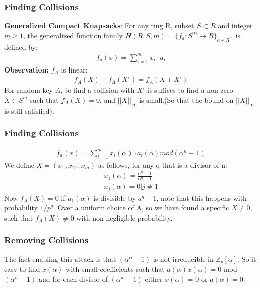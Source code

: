 \documentclass{beamer}
\begin{document}
\begin{frame}
\frametitle{Finding Collisions}
\textbf{Generalized Compact Knapsacks}: For any ring R, subset $S \subset R$ and integer $m \geq 1$, the generalized function family $H(R,S,m) = \{f_a : S^m \rightarrow R\}_{a\in R^m}$ is defined by:
\begin{align*}
f_a(x) = \sum_{i=1}^{m}x_i \cdot a_i
\end{align*}
\textbf{Observation:} $f_A$ is linear:
\begin{align*}
f_A(X) + f_A(X') = f_A (X + X')
\end{align*}
For random key $A$, to find a collision with $X'$ it suffices to find a non-zero $X \in S^m$ such that $f_A(X) = 0$, and $||X||_\infty$ is small.(So that the bound on $||X||_\infty$ is still satisfied).
\end{frame}
\begin{frame}
	\frametitle{Finding Collisions}
	\begin{align*}
		f_a(x) = \sum_{i=1}^{m}x_i(\alpha) \cdot a_i(\alpha) mod (\alpha^n - 1)
	\end{align*}
	We define $X = (x_1,x_2...x_m)$ as follows, for any q that is a divisor of n:
	\begin{align*}
		x_1(\alpha) = \frac{\alpha^n-1}{\alpha^q-1}
		\\
		x_j(\alpha) = 0 | j \neq 1
	\end{align*}
	Now $f_A(X) = 0$ if $a_1(\alpha)$ is divisible by $a^q - 1$, note that this happens with probability $1/p^q$. Over a uniform choice of A, so we have found a specific $X \neq 0$, such that $f_A(X) \neq 0$ with non-negligible probability.
\end{frame}

\begin{frame}
	\frametitle{Removing Collisions}
	The fact enabling this attack is that $(\alpha^n-1)$ is not irreducible in $\mathbb{Z}_p[\alpha]$. So it easy to find $x(\alpha)$ with small coefficients such that $a(\alpha)x(\alpha) = 0$ mod $(\alpha^n-1)$ and for each divisor of $(\alpha^n-1)$ either $x(\alpha) = 0$ or $a(\alpha) = 0$.
\end{frame}
\end{document}
